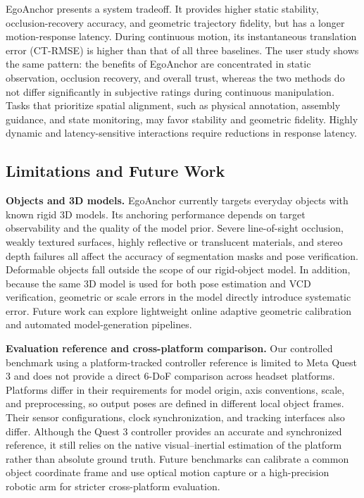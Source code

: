 \documentclass[review]{vgtc}
\begin{document}
EgoAnchor presents a system tradeoff. It provides higher static stability, occlusion-recovery accuracy, and geometric trajectory fidelity, but has a longer motion-response latency. During continuous motion, its instantaneous translation error (CT-RMSE) is higher than that of all three baselines. The user study shows the same pattern: the benefits of EgoAnchor are concentrated in static observation, occlusion recovery, and overall trust, whereas the two methods do not differ significantly in subjective ratings during continuous manipulation. Tasks that prioritize spatial alignment, such as physical annotation, assembly guidance, and state monitoring, may favor stability and geometric fidelity. Highly dynamic and latency-sensitive interactions require reductions in response latency.

\subsection{Limitations and Future Work}

\textbf{Objects and 3D models.}
EgoAnchor currently targets everyday objects with known rigid 3D models. Its anchoring performance depends on target observability and the quality of the model prior. Severe line-of-sight occlusion, weakly textured surfaces, highly reflective or translucent materials, and stereo depth failures all affect the accuracy of segmentation masks and pose verification. Deformable objects fall outside the scope of our rigid-object model. In addition, because the same 3D model is used for both pose estimation and VCD verification, geometric or scale errors in the model directly introduce systematic error. Future work can explore lightweight online adaptive geometric calibration and automated model-generation pipelines.

\textbf{Evaluation reference and cross-platform comparison.}
Our controlled benchmark using a platform-tracked controller reference is limited to Meta Quest 3 and does not provide a direct 6-DoF comparison across headset platforms. Platforms differ in their requirements for model origin, axis conventions, scale, and preprocessing, so output poses are defined in different local object frames. Their sensor configurations, clock synchronization, and tracking interfaces also differ. Although the Quest 3 controller provides an accurate and synchronized reference, it still relies on the native visual--inertial estimation of the platform rather than absolute ground truth. Future benchmarks can calibrate a common object coordinate frame and use optical motion capture or a high-precision robotic arm for stricter cross-platform evaluation.
\end{document}
